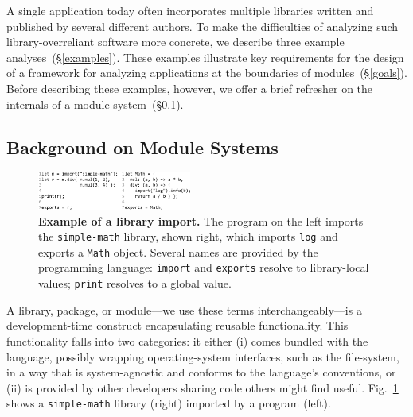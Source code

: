 \documentclass[letterpaper,twocolumn,10pt]{article}
\def\ie{{\em i.e.}, }
\newcommand{\ttt}[1]{\texttt{#1}}
\newcommand{\sx}[1]{(\S\ref{#1})}
\begin{document}
A single application today often incorporates multiple libraries written and published by several different authors.
To make the difficulties of analyzing such library-overreliant software more concrete, we describe three example analyses~\sx{examples}.
These examples illustrate key requirements for the design of a framework for analyzing applications at the boundaries of modules~\sx{goals}.
Before describing these examples, however, we offer a brief refresher on the %
  internals of a module system~\sx{bg1}.


\subsection{Background on Module Systems}
\label{bg1}

\begin{figure}[t]
\raggedleft 
\includegraphics[width=0.45\textwidth]{./figs/lya_ex1.pdf}
\caption{
  \textbf{Example of a library import.}
  \textmd{
    The program on the left imports the \ttt{simple-math} library, shown right, which imports \ttt{log} and exports a \ttt{Math} object.
    Several names are provided by the programming language:
      \ttt{import} and \ttt{exports} resolve to library-local values; \ttt{print} resolves to a global value.
  }
  \vspace{-8mm}
}
\label{fig:ex1}
\end{figure}


A library, package, or module---we use these terms interchangeably---is a development-time construct encapsulating reusable functionality.
This functionality falls into two categories:
  it either (i) comes bundled with the language, possibly wrapping operating-system interfaces, such as the file-system, in a way that is system-agnostic and conforms to the language's conventions,
  or (ii) is provided by other developers sharing code others might find useful.
Fig.~\ref{fig:ex1} shows a \ttt{simple-math} library (right) imported by a program (left).
\end{document}
